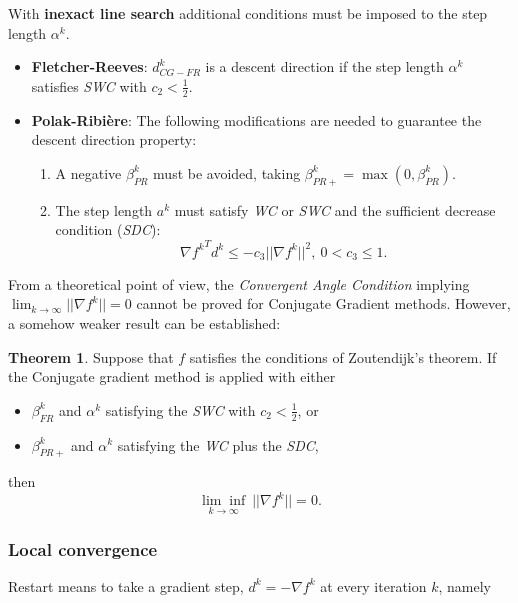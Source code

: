 \documentclass[a4paper, 10pt, twocolumn]{article}
\theoremstyle{definition}
\newtheorem{theorem}{Theorem}
\theoremstyle{remark}
\newcommand{\al}{\alpha}
\begin{document}
With \textbf{inexact line search} additional conditions must be imposed to the step length $\al^k$.

\begin{itemize}
\item \textbf{Fletcher-Reeves}: $d^k_{CG-FR}$ is a descent direction if the step length $\al^k$ satisfies \textit{SWC} with $c_2 < \frac{1}{2}$.

\item \textbf{Polak-Ribière}: The following modifications are needed to guarantee the descent direction property:

\vspace{-5pt}

\begin{enumerate}[label=\roman*.]
\item A negative $\beta^k_{PR}$ must be avoided, taking $\beta^k_{PR+} = \max(0, \beta^k_{PR}).$
\item The step length $a^k$ must satisfy \textit{WC} or \textit{SWC} and the sufficient decrease condition (\textit{SDC}):
$$
{\nabla f^k}^Td^k \leq -c_3||\nabla f^k||^2, \ 0 < c_3 \leq 1.
$$
\end{enumerate}
\end{itemize}

From a theoretical point of view, the \textit{Convergent Angle Condition} implying $\lim_{k\rightarrow\infty}||\nabla f^k|| = 0$ cannot be proved for Conjugate Gradient methods. However, a somehow weaker result can be established:

\begin{theorem}\label{thm: CG}
Suppose that $f$ satisfies the conditions of Zoutendijk's theorem. If the Conjugate gradient method is applied with either
\begin{itemize}
\item $\beta^k_{FR}$ and $\al^k$ satisfying the \textit{SWC} with $c_2 < \frac{1}{2}$, or
\item $\beta^k_{PR+}$ and $\al^k$ satisfying the \textit{WC} plus the \textit{SDC},
\end{itemize}
then
$$
\underset{k\rightarrow\infty}{\lim\inf}\ || \nabla f^k || = 0.
$$
\end{theorem}

\subsubsection*{Local convergence}

Restart means to take a gradient step, $d^k = -\nabla f^k$ at every iteration $k$, namely
\end{document}
